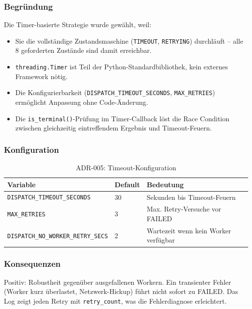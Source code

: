 \subsubsection*{Begründung}

Die Timer-basierte Strategie wurde gewählt, weil:
\begin{itemize}
  \item Sie die vollständige Zustandsmaschine (\texttt{TIMEOUT},
        \texttt{RETRYING}) durchläuft -- alle 8 geforderten Zustände
        sind damit erreichbar.
  \item \texttt{threading.Timer} ist Teil der Python-Standardbibliothek,
        kein externes Framework nötig.
  \item Die Konfigurierbarkeit (\texttt{DISPATCH\_TIMEOUT\_SECONDS},
        \texttt{MAX\_RETRIES}) ermöglicht Anpassung ohne Code-Änderung.
  \item Die \texttt{is\_terminal()}-Prüfung im Timer-Callback löst die
        Race Condition zwischen gleichzeitig eintreffendem Ergebnis
        und Timeout-Feuern.
\end{itemize}

\subsubsection*{Konfiguration}

\begin{table}[H]
\centering
\begin{tabular}{lll}
\toprule
\textbf{Variable} & \textbf{Default} & \textbf{Bedeutung} \\
\midrule
\texttt{DISPATCH\_TIMEOUT\_SECONDS}        & 30 & Sekunden bis Timeout-Feuern \\
\texttt{MAX\_RETRIES}                      & 3  & Max. Retry-Versuche vor FAILED \\
\texttt{DISPATCH\_NO\_WORKER\_RETRY\_SECS} & 2  & Wartezeit wenn kein Worker verfügbar \\
\bottomrule
\end{tabular}
\caption{ADR-005: Timeout-Konfiguration}
\end{table}

\subsubsection*{Konsequenzen}

Positiv: Robustheit gegenüber ausgefallenen Workern.
Ein transienter Fehler (Worker kurz überlastet, Netzwerk-Hickup)
führt nicht sofort zu FAILED.
Das Log zeigt jeden Retry mit \texttt{retry\_count},
was die Fehlerdiagnose erleichtert.

